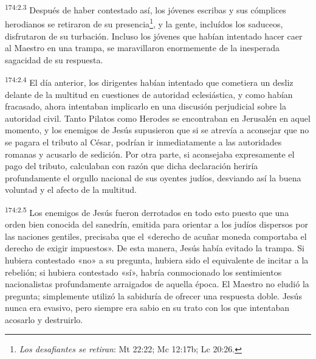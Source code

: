 \par
\textsuperscript{174:2.3} Después de haber contestado así, los jóvenes escribas y sus cómplices herodianos se retiraron de su presencia\footnote{\textit{Los desafiantes se retiran}: Mt 22:22; Mc 12:17b; Lc 20:26.}, y la gente, incluídos los saduceos, disfrutaron de su turbación. Incluso los jóvenes que habían intentado hacer caer al Maestro en una trampa, se maravillaron enormemente de la inesperada sagacidad de su respuesta.

\par
\textsuperscript{174:2.4} El día anterior, los dirigentes habían intentado que cometiera un desliz delante de la multitud en cuestiones de autoridad eclesiástica, y como habían fracasado, ahora intentaban implicarlo en una discusión perjudicial sobre la autoridad civil. Tanto Pilatos como Herodes se encontraban en Jerusalén en aquel momento, y los enemigos de Jesús supusieron que si se atrevía a aconsejar que no se pagara el tributo al César, podrían ir inmediatamente a las autoridades romanas y acusarlo de sedición. Por otra parte, si aconsejaba expresamente el pago del tributo, calculaban con razón que dicha declaración heriría profundamente el orgullo nacional de sus oyentes judíos, desviando así la buena voluntad y el afecto de la multitud.

\par
\textsuperscript{174:2.5} Los enemigos de Jesús fueron derrotados en todo esto puesto que una orden bien conocida del sanedrín, emitida para orientar a los judíos dispersos por las naciones gentiles, precisaba que el «derecho de acuñar moneda comportaba el derecho de exigir impuestos». De esta manera, Jesús había evitado la trampa. Si hubiera contestado «no» a su pregunta, hubiera sido el equivalente de incitar a la rebelión; si hubiera contestado «sí», habría conmocionado los sentimientos nacionalistas profundamente arraigados de aquella época. El Maestro no eludió la pregunta; simplemente utilizó la sabiduría de ofrecer una respuesta doble. Jesús nunca era evasivo, pero siempre era sabio en su trato con los que intentaban acosarlo y destruirlo.

